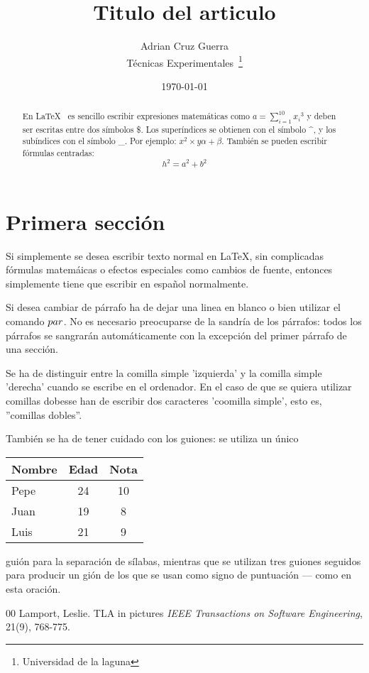 \documentclass[a4paper, 12pt]{article}
\begin{document}
\title {Titulo del articulo}
\author {Adrian Cruz Guerra\\
	    Técnicas Experimentales~\footnote{Universidad de la laguna}
	    }
\date {\today}
\maketitle
\begin{abstract}
  En \LaTeX {}~\cite{Lam:86} es sencillo escribir expresiones 
  matemáticas como $a=\sum_{i=1}^{10} {x_i}^{3}$
  y deben ser escritas entre dos símbolos \$.
  Los superíndices se obtienen con el símbolo \^{}, y
  los subíndices con el símbolo \_.
  Por ejemplo: $x^2 \times y {\alpha + \beta}$.
  También se pueden escribir fórmulas centradas:
  \[h^2=a^2 + b^2\]
\end {abstract}

\section {Primera sección}
Si simplemente se desea escribir texto normal en LaTeX,
sin complicadas f\'ormulas matem\'aicas o efectos especiales
como cambios de fuente, entonces simplemente tiene que escribir
en espa\~nol normalmente. \par
Si desea cambiar de párrafo ha de dejar una linea en blanco o bien
utilizar el comando $\\par$.
No es necesario preocuparse de la sandría de los párrafos:
todos los párrafos se sangrarán automáticamente con la excepción
del primer párrafo de una sección.


Se ha de distinguir entre la comilla simple 'izquierda'
y la comilla simple 'derecha' cuando se escribe en el ordenador.
En el caso de que se quiera utilizar comillas dobesse han de escribir
dos caracteres 'coomilla simple', esto es, 
''comillas dobles''.


También se ha de tener cuidado con los guiones: se utiliza un único
\bigakip
\begin {tabular} {|l|c|c|}
\hline
  Nombre & Edad & Nota \\ \hline
  Pepe   &   24 &   10 \\ \hline
  Juan   &   19 &    8 \\ \hline
  Luis   &   21 &    9 \\ \hline
\end {tabular}
guión para la separación de sílabas, mientras que se utilizan 
tres guiones seguidos para producir un gión de los que se usan
como signo de puntuación --- como en esta oración.
\begin {thebibliography}{00}
    Lamport, Leslie.
    TLA in pictures
    \emph {IEEE Transactions on Software Engineering},
    21(9), 768-775.
\end {thebibliography}
\end{document}
